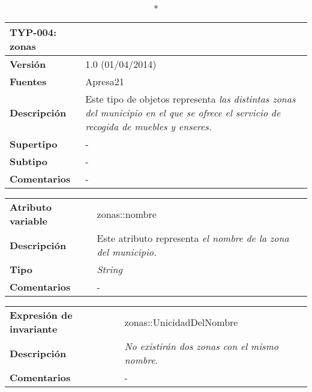 
\begin{longtable}{p{2.5cm}  p{14cm}}
\caption*{\textbf{TYP-004: zonas}} \\
\hline
\textbf{Versión} & 1.0 (01/04/2014) \\
\textbf{Fuentes} & Apresa21 \\
\textbf{Descripción} & Este tipo de objetos representa  \textit{las distintas zonas del municipio en el que se ofrece el servicio de recogida de muebles y enseres.} \\
\textbf{Supertipo} & - \\
\textbf{Subtipo} & -  \\
\textbf{Comentarios} &- \\
\end{longtable}

\begin{longtable}{p{3cm}  p{12cm}}
\hline
\textbf{Atributo variable} & zonas::nombre \\
\textbf{Descripción} & Este atributo representa  \textit{el nombre de la zona del municipio.} \\
\textbf{Tipo} & \textit{String} \\
\textbf{Comentarios} & - \\
\end{longtable}

\begin{longtable}{p{3cm}  p{12cm}}
\hline
\textbf{Expresión de invariante} & zonas::UnicidadDelNombre \\
\textbf{Descripción} &  \textit{No existirán dos zonas con el mismo nombre}.  \\
\textbf{Comentarios} & -\\
\end{longtable}